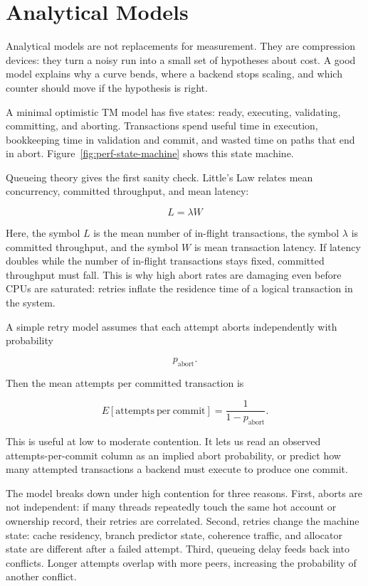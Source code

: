 \section{Analytical Models}
\label{sec:perf-analytical}

Analytical models are not replacements for measurement. They are compression devices: they turn a noisy run into a small set of hypotheses about cost. A good model explains why a curve bends, where a backend stops scaling, and which counter should move if the hypothesis is right.

A minimal optimistic TM model has five states: ready, executing, validating, committing, and aborting. Transactions spend useful time in execution, bookkeeping time in validation and commit, and wasted time on paths that end in abort. Figure~\ref{fig:perf-state-machine} shows this state machine.

Queueing theory gives the first sanity check. Little's Law relates mean concurrency, committed throughput, and mean latency:

$$
L = \lambda W
$$

Here, the symbol $L$ is the mean number of in-flight transactions, the symbol $\lambda$ is committed throughput, and the symbol $W$ is mean transaction latency. If latency doubles while the number of in-flight transactions stays fixed, committed throughput must fall. This is why high abort rates are damaging even before CPUs are saturated: retries inflate the residence time of a logical transaction in the system.

A simple retry model assumes that each attempt aborts independently with probability

$$
p_{\mathrm{abort}}.
$$

Then the mean attempts per committed transaction is

$$
E[\mathrm{attempts\ per\ commit}] =
\frac{1}{1-p_{\mathrm{abort}}}.
$$

This is useful at low to moderate contention. It lets us read an observed attempts-per-commit column as an implied abort probability, or predict how many attempted transactions a backend must execute to produce one commit.

The model breaks down under high contention for three reasons. First, aborts are not independent: if many threads repeatedly touch the same hot account or ownership record, their retries are correlated. Second, retries change the machine state: cache residency, branch predictor state, coherence traffic, and allocator state are different after a failed attempt. Third, queueing delay feeds back into conflicts. Longer attempts overlap with more peers, increasing the probability of another conflict.

